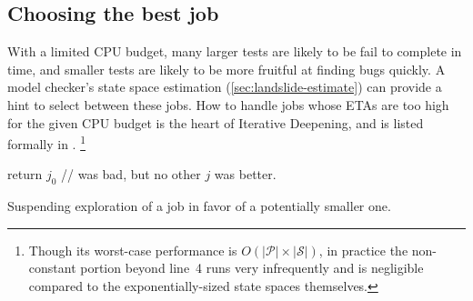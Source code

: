 
\subsection{Choosing the best job}
\label{sec:quicksand-choosing}

With a limited CPU budget, many larger tests are likely to be fail to complete in time,
and smaller tests are likely to be more fruitful at finding bugs quickly.
A model checker's state space estimation (\cref{sec:landslide-estimate})
can provide a hint to select between these jobs.
How to handle jobs whose ETAs are too high for the given CPU budget
is the heart of Iterative Deepening,
and is listed formally in .%
\footnote{
Though its worst-case performance is $O(|\mathcal{P}|\times|\mathcal{S}|)$,
in practice the non-constant portion beyond line~4 runs very infrequently
and is negligible compared to the exponentially-sized state spaces themselves.}

\begin{algorithm}[t]
	return $j_0$ //  was bad, but no other $j$ was better.
	\caption{Suspending exploration of a job in favor of a potentially smaller one.}
	\label{alg:shouldworkblock}
\end{algorithm}

